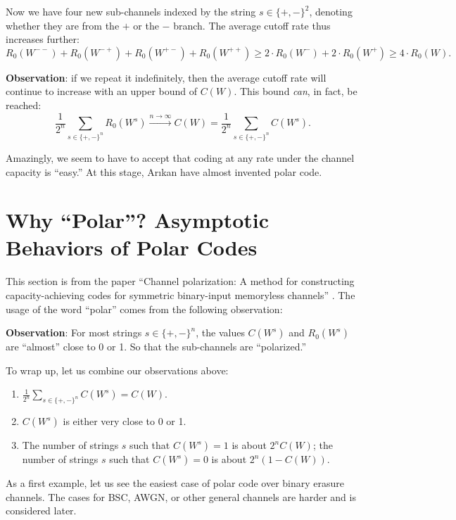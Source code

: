 Now we have four new sub-channels indexed by the string $s\in\{+,-\}^2$, denoting whether they are from the $+$ or the $-$ branch. The average cutoff rate thus increases further:
\begin{equation}
    R_0(W^{--}) + R_0(W^{-+}) + R_0(W^{+-}) + R_0(W^{++}) \ge 2\cdot R_0(W^{-}) + 2\cdot R_0(W^{+}) \ge 4\cdot R_0(W).
\end{equation}

\textbf{Observation}: if we repeat it indefinitely, then the average cutoff rate will continue to increase with an upper bound of $C(W)$. This bound \textit{can}, in fact, be reached:
\begin{equation}
    \frac{1}{2^n} \sum_{s\in\{+,-\}^n} R_0(W^s) \xrightarrow{n\rightarrow\infty} C(W) = \frac{1}{2^n}\sum_{s\in\{+,-\}^n} C(W^s).
\end{equation}

Amazingly, we seem to have to accept that coding at any rate under the channel capacity is ``easy.''  At this stage, Ar{\i}kan have almost invented polar code.

\section{Why ``Polar''? Asymptotic Behaviors of Polar Codes}

This section is from the paper ``Channel polarization: A method for constructing capacity-achieving codes for symmetric binary-input memoryless channels'' \cite{Channel_Polarization}. The usage of the word ``polar'' comes from the following observation:

\textbf{Observation}: For most strings $s\in\{+,-\}^n$, the values $C(W^s)$ and $R_0(W^s)$ are ``almost'' close to 0 or 1. So that the sub-channels are ``polarized.''

To wrap up, let us combine our observations above:
\begin{enumerate}
    \item $\frac{1}{2^n}\sum_{s\in\{+,-\}^n}C(W^s) = C(W)$.
    \item $C(W^s)$ is either very close to 0 or 1.
    \item The number of strings $s$ such that $C(W^s)=1$ is about $2^n C(W)$; the number of strings $s$ such that $C(W^s)=0$ is about $2^n \left(1 - C(W)\right)$.
\end{enumerate}
As a first example, let us see the easiest case of polar code over binary erasure channels. The cases for BSC, AWGN, or other general channels are harder and is considered later.

